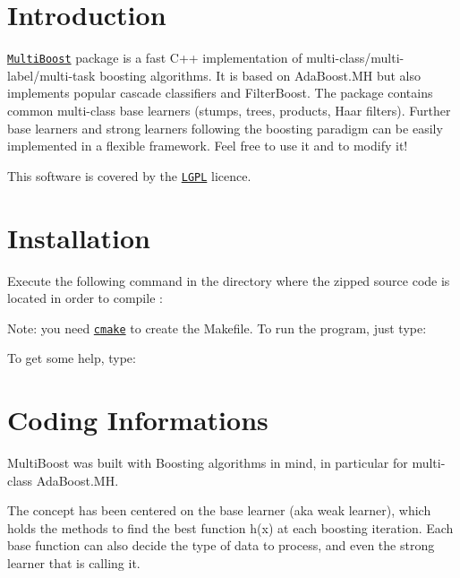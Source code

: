\hypertarget{index_intro_sec}{}\section{Introduction}\label{index_intro_sec}
\href{http://www.multiboost.com}{\tt MultiBoost} package is a fast C++ implementation of multi-\/class/multi-\/label/multi-\/task boosting algorithms. It is based on AdaBoost.MH but also implements popular cascade classifiers and FilterBoost. The package contains common multi-\/class base learners (stumps, trees, products, Haar filters). Further base learners and strong learners following the boosting paradigm can be easily implemented in a flexible framework. Feel free to use it and to modify it!

This software is covered by the \href{http://www.gnu.org/copyleft/lesser.html}{\tt LGPL} licence.\hypertarget{index_install_sec}{}\section{Installation}\label{index_install_sec}
Execute the following command in the directory where the zipped source code is located in order to compile :


\begin{DoxyCode}
\end{DoxyCode}


Note: you need \href{http://www.cmake.org}{\tt cmake} to create the Makefile. To run the program, just type: 
\begin{DoxyCode}
\end{DoxyCode}


To get some help, type: 
\begin{DoxyCode}
\end{DoxyCode}
\hypertarget{index_Basic}{}\section{Coding Informations}\label{index_Basic}
MultiBoost was built with Boosting algorithms in mind, in particular for multi-\/class AdaBoost.MH.

The concept has been centered on the base learner (aka weak learner), which holds the methods to find the best function h(x) at each boosting iteration. Each base function can also decide the type of data to process, and even the strong learner that is calling it.

